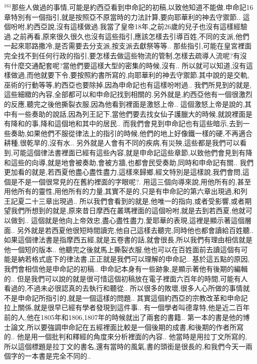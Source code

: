 \documentclass{book}
\begin{document}
$^{161}$那些人做過的事情,可能是約西亞看到申命記的初稿,以致他知道不能做.申命記16章特別有一個指引,就是按照亞不原當時的力法計算,要向耶華利的神去守禦節..
這個吩咐,約西亞說,沒有這樣做過.我當了皇帝18年,之前26歲的兒子也沒有這樣經驗過.之前再看,原來很久很久也沒有這些指引,應該怎樣去引導百姓,不同的支派,他們一起來耶路撒冷,是否需要去分支派,按支派去獻祭等等..
那些指引,可能在皇宮裡面完全找不到任何行政的指引,要怎樣去做這些物流的管制,怎樣去疏導人流呢?有沒有什麼交通配套呢?當他們要這樣大型的密集的時候,沒有..
所以就可以知道,沒有這樣做過,而他就要下令,要按照約書所寫的,向耶華利的神去守禦節.其中說的是交軌,巫術的行動等等,約西亞也要除掉,因為申命記也有這樣吩咐過..
我們所見到的就是,這些細緻的內容,全部都可以和申命記找到相關的.另外就是,約西亞他有一個很激烈的反應,聽完之後他撕裂衣服,因為他看到裡面是激怒上帝..
這個激怒上帝是說的,其中有一些奏助的說話,因為列王記下,當他們要去找女仙子護臘大的時候,就說裡面是有降和的事,降和這個地和其中的居民..
而我們會見到申命記也有這些暗示,去到一些奏助,如果他們不服從律法上的指引的時候,他們的地上好像鐵一樣的硬,不再適合耕種,很乾旱的,沒有水..
另外就是人會有不同的疾病,有災殃,這些都是我們可以看到,可能這個律法書裡面已經有這些內容,就是申命記這些章節,以致他們會見到有降和這些的向導,就是地會被奏助,會被方牆,也都會民受奏助,同時和申命記有關..
我們更加看的就是,若西夏他盡心盡性盡力,這樣來歸鄉,經文特別是這樣說,我們會問,這個是不是一個很常見的在舊約裡面的字眼呢?.
用這三個向導來說,用他所有的,甚至用他所有的靈性,用他所有的力量,其實不是的,只是有申命記的第六章出現過,和列王記夏二十三章出現過..
所以我們會看到的就是,他唯一的指向,或者受影響,或者期望我們所想到的就是,原來昔日摩西在叢瑪裡面的這個吩咐,就是去到若西夏,他就可以做到..
這個就是他向上帝效忠,盡心盡性盡力,愛耶華的表現,這裡是顯示著這個層面..
另外就是若西夏他很短時間讀完,他自己這樣去聽完,同時他也都會讀給百姓聽..
如果這個律法書是指摩西五經,就是五卷書的話,就會很長,所以我們有理由相信就是他一個短的版本..
他聽完之後就馬上撕裂衣服,他也可以在百姓面前去讀這個有可能是納若格式底下的律法書,正正就是我們可以理解的申命記..
基於這五點的原因,我們會相信他是申命記的初稿..
申命記本身有一些跡象,是顯示著他有後期的編輯的..
但是我們可以說的就是很可惜這個初稿放在電子裡面六百年的時間,可能有人看過的,不過未必很認真的去執行和聽從..
所以很多的敗壞,很多人心所做的事情就不是申命記所指引的,就是一個這樣的問題..
其實這個約西亞的宗教改革和申命記拉上關係,就是很早已經有學者發現到這件事..
有一個學者叫德韋特,他是近二百年前的人,他在1805年和1806,1807年的時候就出了兩套的書籍..
第一本的書是他的博士論文,所以要強調申命記在五經裡面比較是一個後期的成書,和後期的作者所寫的..
他是用一個批判和釋經的角度來分析裡面的內容..
他當時是用拉丁文所寫的,所以這個標題是拉丁文的書名,還有當時的風氣,書的頭銜是很長的,和我們今天一兩個字的一本書是完全不同的..
\end{document}
